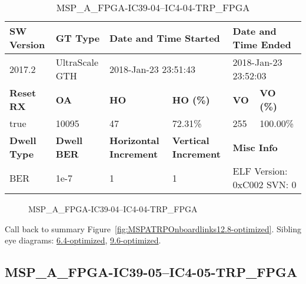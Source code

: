 \begin{table}[h]
\centering
\caption{MSP\_A\_FPGA-IC39-04--IC4-04-TRP\_FPGA}
\label{tab:MSPAFPGAIC3904IC404TRPFPGA12.8-optimized}
\begin{tabular}{@{}|l|l|l|l|l|l|@{}}
\toprule
\textbf{SW Version}                & \textbf{GT Type}   & \multicolumn{2}{l|}{\textbf{Date and Time Started}}            & \multicolumn{2}{l|}{\textbf{Date and Time Ended}}        \\ \midrule
2017.2                       & UltraScale GTH          & \multicolumn{2}{l|}{2018-Jan-23 23:51:43}                   & \multicolumn{2}{l|}{2018-Jan-23 23:52:03}               \\ \midrule
\textbf{Reset RX}                  & \textbf{OA} & \textbf{HO}   & \textbf{HO (\%)} & \textbf{VO} & \textbf{VO (\%)} \\ \midrule
true & 10095        & 47          & 72.31\%        & 255        & 100.00\%       \\ \midrule
\textbf{Dwell Type}                & \textbf{Dwell BER} & \textbf{Horizontal Increment} & \textbf{Vertical Increment}    & \multicolumn{2}{l|}{\textbf{Misc Info}}                  \\ \midrule
BER                            & 1e-7        & 1        & 1           & \multicolumn{2}{l|}{ELF Version: 0xC002 SVN: 0}                         \\ \bottomrule
\end{tabular}
\end{table}

\begin{figure}[h]
\caption{MSP\_A\_FPGA-IC39-04--IC4-04-TRP\_FPGA} \label{fig:MSPAFPGAIC3904IC404TRPFPGA12.8-optimized}
\end{figure}

Call back to summary Figure~\ref{fig:MSPATRPOnboardlinks12.8-optimized}.
Sibling eye diagrams: \hyperref[sec:MSPAFPGAIC3904IC404TRPFPGA6.4-optimized]{6.4-optimized}, \hyperref[sec:MSPAFPGAIC3904IC404TRPFPGA9.6-optimized]{9.6-optimized}.

\clearpage
\newpage


\subsection{MSP\_A\_FPGA-IC39-05--IC4-05-TRP\_FPGA}\label{sec:MSPAFPGAIC3905IC405TRPFPGA12.8-optimized}

